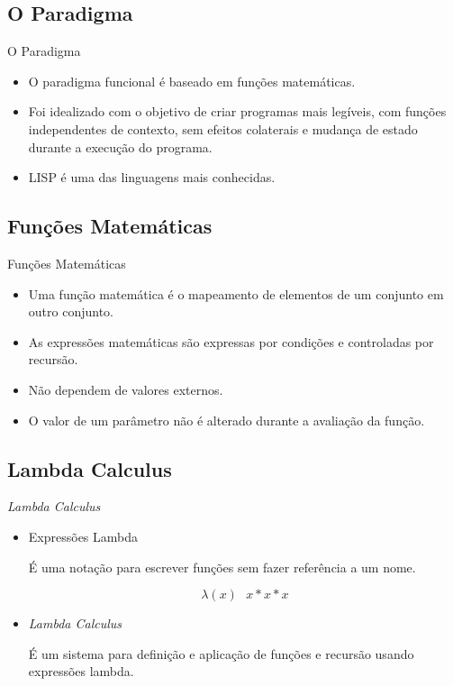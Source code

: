 \documentclass[12pt]{beamer} %
\begin{document}
\subsection{O Paradigma}
\begin{frame}{O Paradigma}
	\begin{itemize}
	\setlength\itemsep{1.5em}
		\item O paradigma funcional é baseado em funções matemáticas.

		\item Foi idealizado com o objetivo de criar programas mais legíveis, com funções independentes de contexto, sem efeitos colaterais e mudança de estado durante a execução do programa.

		\item LISP é uma das linguagens mais conhecidas.
	\end{itemize}
\end{frame}

\subsection{Funções Matemáticas}

\begin{frame}{Funções Matemáticas}
	\begin{itemize}
	\setlength\itemsep{1.5em}
		\item Uma função matemática é o mapeamento de elementos de um conjunto em outro conjunto.
		
		\item As expressões matemáticas são expressas por condições e controladas por recursão.

		\item Não dependem de valores externos.

		\item O valor de um parâmetro não é alterado durante a avaliação da função.
	\end{itemize}
\end{frame}

\subsection{Lambda Calculus}

\begin{frame}{\textit{Lambda Calculus}}
	\begin{itemize}
	\setlength\itemsep{1.5em}
		\item Expressões Lambda

		É uma notação para escrever funções sem fazer referência a um nome.

		\begin{equation*}
			\lambda(x) \text{ } x*x*x
		\end{equation*}


		\item \textit{Lambda Calculus}

		É um sistema para definição e aplicação de funções e recursão usando expressões lambda.
	\end{itemize}
\end{frame}
\end{document}
